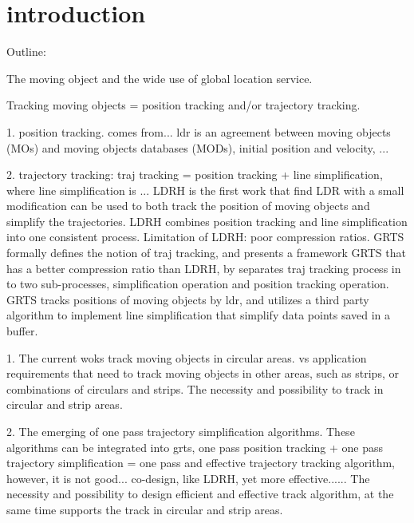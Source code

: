 

\section{introduction}
\label{sec-intro}

Outline:

The moving object and the wide use of global location service.

Tracking moving objects = position tracking and/or trajectory tracking.

1. position tracking.
comes from...
ldr is an agreement between moving objects (MOs) and moving objects databases (MODs), initial position and velocity, ...

2. trajectory tracking: 
traj tracking = position tracking + line simplification, where line simplification is ...
LDRH is the first work that find LDR with a small modification can be used to both track the position of moving objects and simplify the trajectories. LDRH combines position tracking and line simplification into one consistent process. Limitation of LDRH: poor compression ratios. 
GRTS formally defines the notion of traj tracking, and presents a framework GRTS that has a better compression ratio than LDRH, by separates traj tracking process in to two sub-processes, simplification operation and position tracking operation. GRTS tracks positions of moving objects by ldr, and utilizes a third party algorithm to implement line simplification that simplify data points saved in a buffer.



1. The current woks track moving objects in circular areas. vs application requirements that need to track moving objects in other areas, such as strips, or combinations of circulars and strips.
The necessity and possibility to track in circular and strip areas.


2. The emerging of one pass trajectory simplification algorithms. These algorithms can be integrated into grts, one pass position tracking + one pass trajectory simplification = one pass and effective trajectory tracking algorithm, however, it is not good... co-design, like LDRH, yet more effective...... 
The necessity and possibility to design efficient and effective track algorithm, at the same time supports the track in circular and strip areas.

